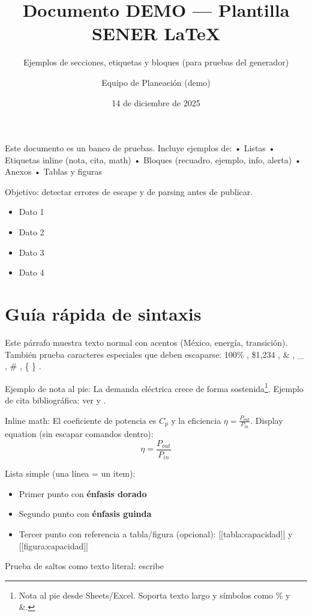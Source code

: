 \documentclass{sener2025}
\title{Documento DEMO — Plantilla SENER LaTeX}
\subtitle{Ejemplos de secciones, etiquetas y bloques (para pruebas del generador)}
\author{Equipo de Planeación (demo)}
\date{14 de diciembre de 2025}
\begin{document}

\tableofcontents
\newpage

\listafiguras
\newpage

\listatablas
\newpage

\begin{resumenejecutivo}
Este documento es un banco de pruebas. Incluye ejemplos de:
• Listas
• Etiquetas inline (nota, cita, math)
• Bloques (recuadro, ejemplo, info, alerta)
• Anexos
• Tablas y figuras

Objetivo: detectar errores de escape y de parsing antes de publicar.
\end{resumenejecutivo}

\begin{datosclave}
  \begin{itemize}
    \item Dato 1
    \item Dato 2
    \item Dato 3
    \item Dato 4
  \end{itemize}
\end{datosclave}


\section{Guía rápida de sintaxis}

Este párrafo muestra texto normal con acentos (México, energía, transición).
También prueba caracteres especiales que deben escaparse: 100\% , \$1,234 , \& , \_ , \# , \{ \} .

Ejemplo de nota al pie: La demanda eléctrica crece de forma sostenida\footnote{Nota al pie desde Sheets/Excel. Soporta texto largo y símbolos como \% y \&.}.
Ejemplo de cita bibliográfica: ver \cite{demo_sener2025} y \cite{cenace2023_flex}.

Inline math: El coeficiente de potencia es $C_p$ y la eficiencia $\eta = \frac{P_{out}}{P_{in}}$.
Display equation (sin escapar comandos dentro):
\begin{equation}
\eta = \frac{P_{out}}{P_{in}}
\end{equation}

Lista simple (una línea = un item):
\begin{itemize}
  \item Primer punto con \textbf{\textcolor{gobmxDorado}{énfasis dorado}}
  \item Segundo punto con \textbf{\textcolor{gobmxGuinda}{énfasis guinda}}
  \item Tercer punto con referencia a tabla/figura (opcional): [[tabla:capacidad]] y [[figura:capacidad]]
\end{itemize}
Prueba de saltos como texto literal: escribe
\end{document}
